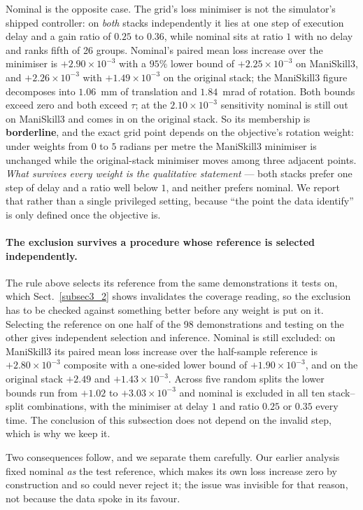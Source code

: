 \documentclass[pdflatex,iicol,sn-apa]{sn-jnl}
\theoremstyle{remark}
\begin{document}
Nominal is the opposite case. The grid's loss minimiser is not the simulator's shipped controller:
on \emph{both} stacks independently it lies at one step of execution delay and a gain ratio of
$0.25$ to $0.36$, while nominal sits at ratio $1$ with no delay and ranks fifth of 26 groups.
Nominal's paired mean loss increase over the minimiser is $+2.90\times10^{-3}$ with a $95\%$ lower
bound of $+2.25\times10^{-3}$ on ManiSkill3, and $+2.26\times10^{-3}$ with $+1.49\times10^{-3}$ on
the original stack; the ManiSkill3 figure decomposes into $1.06$~mm of translation and $1.84$~mrad
of rotation. Both bounds exceed zero and both exceed $\tau$; at the $2.10\times10^{-3}$ sensitivity
nominal is still out on ManiSkill3 and comes in on the original stack. So its membership is
\textbf{borderline}, and the exact grid point depends on the objective's rotation weight: under
weights from $0$ to $5$ radians per metre the ManiSkill3 minimiser is unchanged while the
original-stack minimiser moves among three adjacent points. \emph{What survives every weight is the
qualitative statement} --- both stacks prefer one step of delay and a ratio well below $1$, and
neither prefers nominal. We report that rather than a single privileged setting, because ``the point
the data identify'' is only defined once the objective is.

\paragraph{The exclusion survives a procedure whose reference is selected independently.}
The rule above selects its reference from the same demonstrations it tests on, which
Sect.~\ref{subsec3_2} shows invalidates the coverage reading, so the exclusion has to be checked
against something better before any weight is put on it. Selecting the reference on one half of the
98 demonstrations and testing on the other gives independent selection and inference. Nominal is
still excluded: on ManiSkill3 its paired mean loss increase over the half-sample reference is
$+2.80\times10^{-3}$ composite with a one-sided lower bound of $+1.90\times10^{-3}$, and on the
original stack $+2.49$ and $+1.43\times10^{-3}$. Across five random splits the lower bounds run from
$+1.02$ to $+3.03\times10^{-3}$ and nominal is
excluded in all ten stack--split combinations, with the minimiser at delay $1$ and ratio $0.25$ or
$0.35$ every time. The conclusion of this subsection does not depend on the invalid step, which is
why we keep it.

Two consequences follow, and we separate them carefully. Our earlier analysis fixed nominal \emph{as}
the test reference, which makes its own loss increase zero by construction and so could never reject
it; the issue was invisible for that reason, not because the data spoke in its favour.
\end{document}
